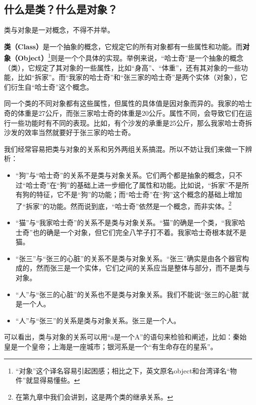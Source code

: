 \subsection*{什么是类？什么是对象？}
类与对象是一对概念，不得不并举。\par
\textbf{类（Class）}是一个抽象的概念，它规定它的所有对象都有一些属性和功能。而\textbf{对象（Object）}\footnote{``对象''这个译名容易引起困感；相比之下，英文原名object和台湾译名``物件''就显得易懂些。}则是一个个具体的实现。举例来说，``哈士奇''是一个抽象的概念（类），它规定了其对象的一些属性，比如``身高''、``体重''，还有其对象的一些功能，比如``拆家''。而``我家的哈士奇''和``张三家的哈士奇''是两个实体（对象），它们衍生自``哈士奇''这个概念。\par
同一个类的不同对象都有这些属性，但属性的具体值是因对象而异的。我家的哈士奇的体重是27公斤，而张三家哈士奇的体重是20公斤。属性不同，会导致它们在运行一些功能时有不同的表现。比如，有个沙发的承重是25公斤，那么我家哈士奇拆沙发的效率当然就要好于张三家的哈士奇。\par
我们经常容易把类与对象的关系和另外两组关系搞混。所以不妨让我们来做一下辨析：\par
\begin{itemize}
    \item ``狗''与``哈士奇''的关系不是类与对象关系。它们两个都是抽象的概念，只不过``哈士奇''在``狗''的基础上进一步细化了属性和功能。比如说，``拆家''不是所有狗的特征，它不是``狗''的功能；而``哈士奇''在``狗''这个概念的基础上增加了``拆家''的功能。然而说到底，``哈士奇''依然是一个概念，而非实体。\footnote{在第九章中我们会讲到，这是两个类的继承关系。}
    \item ``猫''与``我家哈士奇''的关系不是类与对象关系。``猫''的确是一个类，``我家哈士奇''也的确是一个对象，但它们完全八竿子打不着。我家哈士奇根本就不是猫。
    \item ``张三''与``张三的心脏''的关系不是类与对象关系。``张三''确实是由各个器官构成的，然而张三是一个实体，它们之间的关系应当是整体与部分，而不是类与对象。
    \item ``人''与``张三的心脏''的关系也不是类与对象关系。我们不能说``张三的心脏''就是一个人。
    \item ``人''与``张三''的关系是类与对象关系。张三是一个人。
\end{itemize}
可以看出，类与对象的关系可以用``a是一个A''的语句来检验和阐述，比如：秦始皇是一个皇帝；上海是一座城市；银河系是一个``有生命存在的星系''。\par

